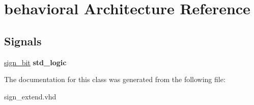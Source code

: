 \hypertarget{classsign__extend_1_1behavioral}{\section{behavioral \-Architecture \-Reference}
\label{classsign__extend_1_1behavioral}
}
\*
\*
\subsection*{\-Signals}
 \begin{DoxyCompactItemize}
\item 
\hypertarget{classsign__extend_1_1behavioral_a520b8edd2c9685b52feb4cac819127d2}{\hyperlink{classsign__extend_1_1behavioral_a520b8edd2c9685b52feb4cac819127d2}{sign\-\_\-bit} {\bfseries std\-\_\-logic } }\label{classsign__extend_1_1behavioral_a520b8edd2c9685b52feb4cac819127d2}

\end{DoxyCompactItemize}


\-The documentation for this class was generated from the following file\-:\begin{DoxyCompactItemize}
\item 
sign\-\_\-extend.\-vhd\end{DoxyCompactItemize}
